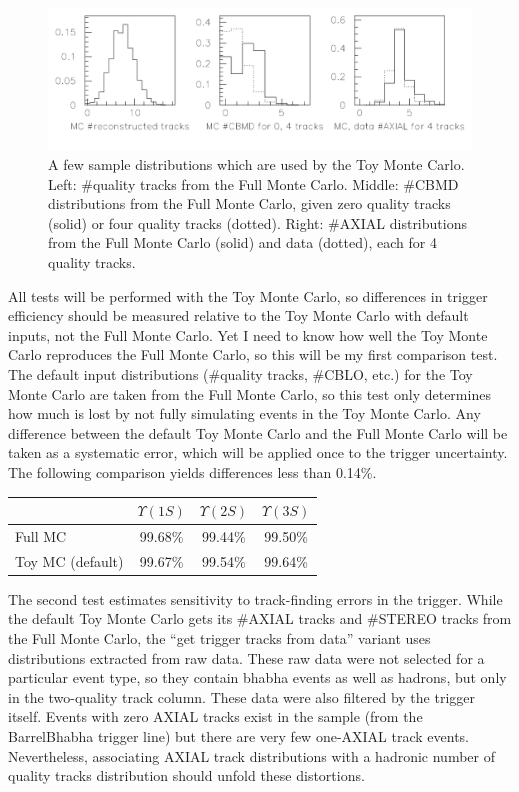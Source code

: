 \begin{figure}[t]
  \begin{center}
    \includegraphics[width=\linewidth]{plots/trigger_toymcexamples}
  \end{center}
  \vspace{-1.3 cm}
  \caption{\label{trigger_toymcexamples} A few sample distributions
    which are used by the Toy Monte Carlo.  Left: \#quality tracks
    from the Full Monte Carlo.  Middle: \#CBMD distributions from the
    Full Monte Carlo, given zero quality tracks (solid) or four
    quality tracks (dotted).  Right: \#AXIAL distributions from the
    Full Monte Carlo (solid) and data (dotted), each for 4 quality
    tracks.}
\end{figure}

All tests will be performed with the Toy Monte Carlo, so differences
in trigger efficiency should be measured relative to the Toy Monte
Carlo with default inputs, not the Full Monte Carlo.  Yet I need to
know how well the Toy Monte Carlo reproduces the Full Monte Carlo, so
this will be my first comparison test.  The default input
distributions (\#quality tracks, \#CBLO, etc.) for the Toy Monte Carlo
are taken from the Full Monte Carlo, so this test only determines how
much is lost by not fully simulating events in the Toy Monte Carlo.
Any difference between the default Toy Monte Carlo and the Full Monte
Carlo will be taken as a systematic error, which will be applied once
to the trigger uncertainty.  The following comparison yields
differences less than 0.14\%.
\begin{center}
  \begin{tabular}{l c c c}
    & $\Upsilon(1S)$ & $\Upsilon(2S)$ & $\Upsilon(3S)$ \\\hline
    Full MC & 99.68\% & 99.44\% & 99.50\% \\
    Toy MC (default) & 99.67\% & 99.54\% & 99.64\% \\
  \end{tabular}
\end{center}

The second test estimates sensitivity to track-finding errors in the
trigger.  While the default Toy Monte Carlo gets its \#AXIAL tracks
and \#STEREO tracks from the Full Monte Carlo, the ``get trigger
tracks from data'' variant uses distributions extracted from raw data.
These raw data were not selected for a particular event type, so they
contain bhabha events as well as hadrons, but only in the two-quality
track column.  These data were also filtered by the trigger itself.
Events with zero AXIAL tracks exist in the sample (from the
BarrelBhabha trigger line) but there are very few one-AXIAL track
events.  Nevertheless, associating AXIAL track distributions with a
hadronic number of quality tracks distribution should unfold these
distortions.

